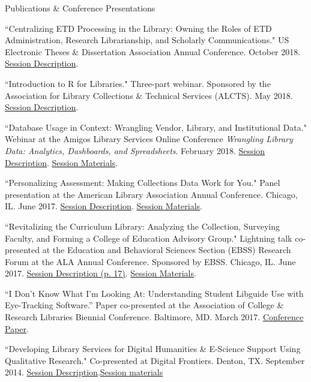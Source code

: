 \documentclass{resume} %
\begin{document}
\begin{rSection}{Publications \& Conference Presentations}
\begin{rSubsectionConf}{2em}
``Centralizing ETD Processing in the Library: Owning the Roles of ETD Administration, Research Librarianship, and Scholarly Communications." US Electronic Theses \& Dissertation Association Annual Conference. October 2018. \href{http://www.ocs.usetda.org/index.php/USETDA/USETDA2018/paper/view/138}{Session Description}.

``Introduction to R for Libraries." Three-part webinar. Sponsored by the Association for Library Collections \& Technical Services (ALCTS). May 2018. \href{http://www.ala.org/alcts/confevents/upcoming/webinar/IntrotoR}{Session Description}.

``Database Usage in Context: Wrangling Vendor, Library, and Institutional Data." Webinar at the Amigos Library Services Online Conference \textit{Wrangling Library Data: Analytics, Dashboards, and Spreadsheets}. February 2018. \href{http://www.amigos.org/wrangling_data}{Session Description}. \href{http://uhcl.libguides.com/alcts/amigos}{Session Materials}.

``Personalizing Assessment: Making Collections Data Work for You." Panel presentation at the American Library Association Annual Conference.  Chicago, IL. June 2017. \href{https://alcts.ala.org/news/2017/ac-personalizing-assessment/}{Session Description}. \href{http://uhcl.libguides.com/alcts}{Session Materials}.

``Revitalizing the Curriculum Library: Analyzing the Collection, Surveying Faculty, and Forming a College of Education Advisory Group." Lightning talk co-presented at the Education and Behavioral Sciences Section (EBSS) Research Forum at the ALA Annual Conference. Sponsored by EBSS. Chicago, IL. June 2017. \href{http://www.ala.org/acrl/sites/ala.org.acrl/files/content/aboutacrl/directoryofleadership/sections/ebss/ebsswebsite/ebssnewsletter/ebss_fall2017.pdf}{Session Description (p. 17)}. \href{http://www.ala.org/acrl/aboutacrl/directoryofleadership/sections/ebss/ebsswebsite/poster-forum}{Session Materials}. 

``I Don’t Know What I’m Looking At: Understanding Student Libguide Use with Eye-Tracking Software.” Paper co-presented at the Association of College \& Research Libraries Biennial Conference. Baltimore, MD. March 2017. \href{http://www.ala.org/acrl/sites/ala.org.acrl/files/content/conferences/confsandpreconfs/2017/IDontKnowWhatImLookingat.pdf}{Conference Paper}.

``Developing Library Services for Digital Humanities \& E-Science Support Using Qualitative Research." Co-presented at Digital Frontiers. Denton, TX. September 2014. \href{https://rafiamirzasite.wordpress.com/2016/03/13/developing-library-services-for-digital-humanities/}{Session Description}.\href{https://www.slideshare.net/librarianrafia/digital-frontiers-2014}{Session materials}
\end{rSubsectionConf}


\end{rSection}
\end{document}
